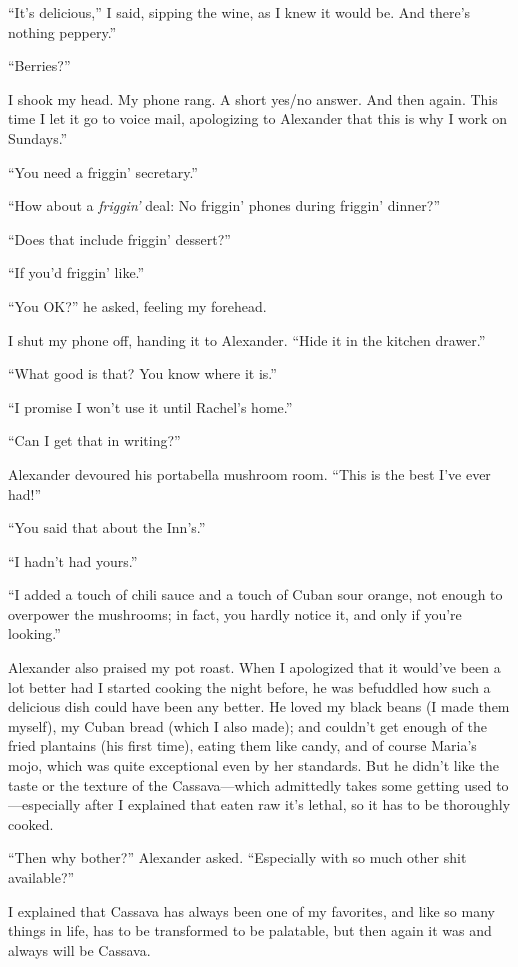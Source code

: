 ``It's delicious,'' I said, sipping the wine, as I knew it would be. And
there's nothing peppery.''

``Berries?''

I shook my head. My phone rang. A short yes/no answer. And then again.
This time I let it go to voice mail, apologizing to Alexander that this
is why I work on Sundays.''

``You need a friggin' secretary.''

``How about a \emph{friggin'} deal: No friggin' phones during friggin'
dinner?''

``Does that include friggin' dessert?''

``If you'd friggin' like.''

``You OK?'' he asked, feeling my forehead.

I shut my phone off, handing it to Alexander. ``Hide it in the kitchen
drawer.''

``What good is that? You know where it is.''

``I promise I won't use it until Rachel's home.''

``Can I get that in writing?''

Alexander devoured his portabella mushroom room. ``This is the best I've
ever had!''

``You said that about the Inn's.''

``I hadn't had yours.''

``I added a touch of chili sauce and a touch of Cuban sour orange, not
enough to overpower the mushrooms; in fact, you hardly notice it, and
only if you're looking.''

Alexander also praised my pot roast. When I apologized that it would've
been a lot better had I started cooking the night before, he was
befuddled how such a delicious dish could have been any better. He loved
my black beans (I made them myself), my Cuban bread (which I also made);
and couldn't get enough of the fried plantains (his first time), eating
them like candy, and of course Maria's mojo, which was quite exceptional
even by her standards. But he didn't like the taste or the texture of
the Cassava---which admittedly takes some getting used to---especially
after I explained that eaten raw it's lethal, so it has to be thoroughly
cooked.

``Then why bother?'' Alexander asked. ``Especially with so much other
shit available?''

I explained that Cassava has always been one of my favorites, and like
so many things in life, has to be transformed to be palatable, but then
again it was and always will be Cassava.


